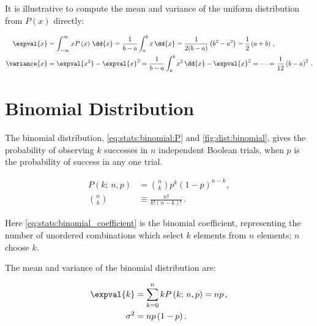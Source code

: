 It is illustrative to compute the mean and variance of the uniform distribution from $P(x)$ directly:

\begin{subequations}\label{eq:stats:uniform:mean_variance}
\begin{align}
\expval{x} &= \int_{-\infty}^{\infty} x P\left(x\right) \, \dd{x} = \frac{1}{b-a} \int_{a}^{b} x \, \dd{x} = \frac{1}{2(b-a)}\left(b^{2} - a^{2}\right) = \frac{1}{2}\left(a + b\right)\,, \label{eq:stats:uniform:mean_variance:mean} \\
\variance{x} &= \expval{x^{2}} - \expval{x}^{2} = \frac{1}{b-a} \int_{a}^{b} x^{2} \, \dd{x} - \expval{x}^{2} = \cdots = \frac{1}{12}\left(b-a\right)^{2}\,. \label{eq:stats:uniform:mean_variance:variance}
\end{align}
\end{subequations}

\section{Binomial Distribution}
\label{stats:binomial}

The binomial distribution, \cref{eq:stats:binomial:P} and \cref{fig:dist:binomial},
gives the probability of observing $k$ successes in $n$ independent Boolean trials,
when $p$ is the probability of success in any one trial.

\begin{subequations}\label{eq:stats:binomial}
\begin{align}
P\left(k;\,n,p\right) &= \binom{n}{k} p^{k} \left(1-p\right)^{n-k}, \label{eq:stats:binomial:P} \\
\binom{n}{k} &\equiv \frac{n!}{k!\left(n-k\right)!}\,. \label{eq:stats:binomial_coefficient}
\end{align}
\end{subequations}

\noindent Here \cref{eq:stats:binomial_coefficient} is the binomial coefficient,
representing the number of unordered combinations
which select $k$ elements from $n$ elements; $n$ choose $k$.

The mean and variance of the binomial distribution are:

\begin{subequations}\label{eq:stats:binomial:mean_variance}
\begin{align}
\expval{k} &= \sum_{k=0}^{n} k P\left(k;\,n,p\right) = n p\,, \label{eq:stats:binomial:mean} \\
\sigma^{2} &= n p\left(1-p\right). \label{eq:stats:binomial:variance}
\end{align}
\end{subequations}

